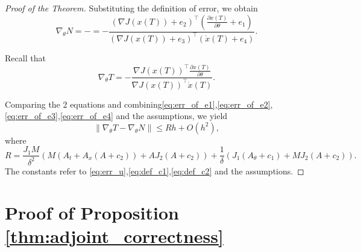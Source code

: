 \documentclass{article}
\begin{document}
\begin{proof}[Proof of the Theorem]
    Substituting the definition of error, we obtain
    \[\nabla_{\theta} N = -=-
    \frac{(\nabla J(x(T))+e_2)^\top(\frac{\partial x(T)}{\partial\theta}+e_1)}{(\nabla J(x(T))+e_3)^\top(\dot{x}(T)+e_4)}.\]
    
    Recall that \[
    \nabla_{\theta} T=-\frac{\nabla J(x(T))^\top\frac{\partial x(T)}{\partial \theta}}{\nabla J(x(T))^\top\dot{x}(T)}.\]

    Comparing the 2 equations and combining\ref{eq:err_of_e1},\ref{eq:err_of_e2},\ref{eq:err_of_e3},\ref{eq:err_of_e4} and the assumptions, we yield
    \[\|\nabla_{\theta}T-\nabla_{\theta}N\|\leq
    Rh+O(h^2)
    ,\]
    where
    \[R=\frac{J_1M}{\delta^2}(M(A_t+A_x(A+c_2))+AJ_2(A+c_2))+\frac1\delta(J_1(A_{\theta}+c_1)+MJ_2(A+c_2)). \]
    The constants refer to \ref{eq:err_u},\ref{eq:def_c1},\ref{eq:def_c2} and the assumptions. 
\end{proof}
\fi
\section{Proof of Proposition \ref{thm:adjoint_correctness}}
\label{app:proof-adjoint}
\end{document}
